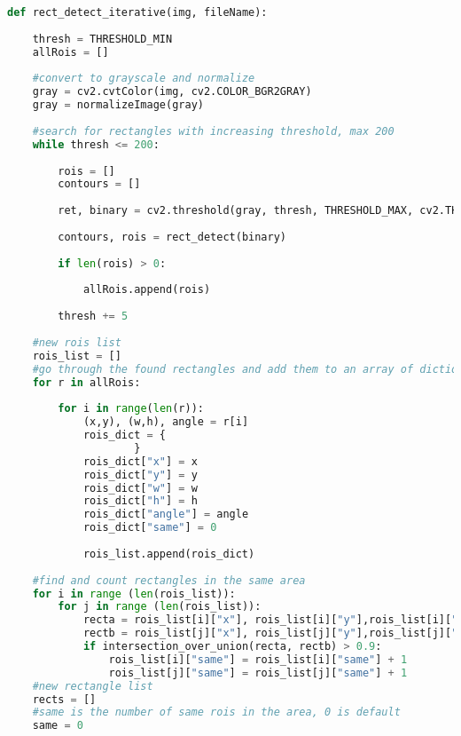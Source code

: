 \begin{lstlisting}[language=Python]
def rect_detect_iterative(img, fileName):
        
    thresh = THRESHOLD_MIN
    allRois = []
        
    #convert to grayscale and normalize
    gray = cv2.cvtColor(img, cv2.COLOR_BGR2GRAY)     
    gray = normalizeImage(gray)
        
    #search for rectangles with increasing threshold, max 200
    while thresh <= 200:
            
        rois = []            
        contours = []            
        
        ret, binary = cv2.threshold(gray, thresh, THRESHOLD_MAX, cv2.THRESH_BINARY)    
            
        contours, rois = rect_detect(binary)
            
        if len(rois) > 0:       
                
            allRois.append(rois)
                
        thresh += 5
        
    #new rois list
    rois_list = []        
    #go through the found rectangles and add them to an array of dictionaries
    for r in allRois:
            
        for i in range(len(r)):
            (x,y), (w,h), angle = r[i]
            rois_dict = {
                    }
            rois_dict["x"] = x
            rois_dict["y"] = y
            rois_dict["w"] = w
            rois_dict["h"] = h
            rois_dict["angle"] = angle
            rois_dict["same"] = 0
                
            rois_list.append(rois_dict)
        
    #find and count rectangles in the same area
    for i in range (len(rois_list)):
        for j in range (len(rois_list)):
            recta = rois_list[i]["x"], rois_list[i]["y"],rois_list[i]["w"],rois_list[i]["h"]
            rectb = rois_list[j]["x"], rois_list[j]["y"],rois_list[j]["w"],rois_list[j]["h"]
            if intersection_over_union(recta, rectb) > 0.9:
                rois_list[i]["same"] = rois_list[i]["same"] + 1
                rois_list[j]["same"] = rois_list[j]["same"] + 1
    #new rectangle list
    rects = []
    #same is the number of same rois in the area, 0 is default
    same = 0
        

\end{lstlisting}

